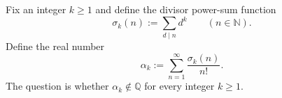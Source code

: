 Fix an integer $k\ge 1$ and define the divisor power-sum function
\[
\sigma_k(n) := \sum_{d\mid n} d^k\qquad (n\in\mathbb{N}).
\]
Define the real number
\[
\alpha_k := \sum_{n=1}^{\infty} \frac{\sigma_k(n)}{n!}.
\]
The question is whether $\alpha_k\notin\mathbb{Q}$ for every integer $k\ge 1$.
